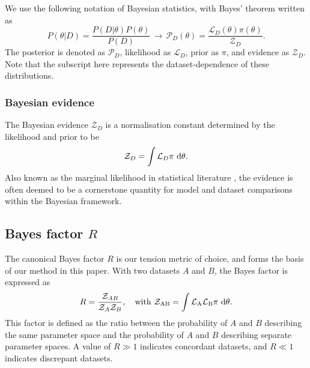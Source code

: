 \documentclass[%
 reprint,
 amsmath,amssymb,
 aps,
]{revtex4-2}
\begin{document}
We use the following notation of Bayesian statistics, with Bayes' theorem written as
\begin{equation}
    P(\theta|D) = \frac{P(D|\theta)P(\theta)}{P(D)} \, \longrightarrow \, \mathcal{P}_D(\theta) = \frac{\mathcal{L}_D(\theta) \pi(\theta)}{\mathcal{Z}_D}.
\end{equation}
The posterior is denoted as $\mathcal{P}_D$, likelihood as $\mathcal{L}_D$, prior as $\pi$, and evidence as $\mathcal{Z}_D$. Note that the subscript here represents the dataset-dependence of these distributions. 

\subsubsection{Bayesian evidence}
The Bayesian evidence $\mathcal{Z}_D$ is a normalisation constant determined by the likelihood and prior to be
\begin{equation}
    \mathcal{Z}_D = \int \mathcal{L}_D \pi \ \rm{d} \theta.
\end{equation}
Also known as the marginal likelihood in statistical literature \cite{Trotta2008}, the evidence is often deemed to be a cornerstone quantity for model and dataset comparisons within the Bayesian framework. 


\subsection{Bayes factor $R$}

The canonical Bayes factor $R$ \cite{Marshall2006,Lemos2020_1} is our tension metric of choice, and forms the basis of our method in this paper. With two datasets $A$ and $B$, the Bayes factor is expressed as
\begin{equation}
    R = \frac{\mathcal{Z}_{AB}}{\mathcal{Z}_A \mathcal{Z}_B}, \quad \rm{with} \ \mathcal{Z}_{AB} = \int \mathcal{L}_A \mathcal{L}_B \pi \ \rm{d}\theta.
\end{equation}
This factor is defined as the ratio between the probability of $A$ and $B$ describing the same parameter space and the probability of $A$ and $B$ describing separate parameter spaces. A value of $R \gg 1$ indicates concordant datasets, and $R \ll 1$ indicates discrepant datasets.
\end{document}
